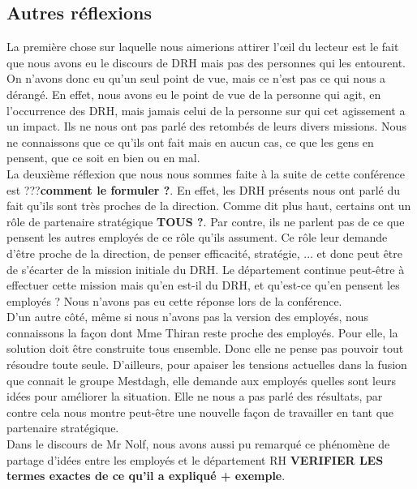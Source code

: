 \subsection{Autres réflexions}

La première chose sur laquelle nous aimerions attirer l'œil du lecteur est le fait que nous avons eu le discours de DRH mais pas des personnes qui les entourent. On n'avons donc eu qu'un seul point de vue, mais ce n'est pas ce qui nous a dérangé. En effet, nous avons eu le point de vue de la personne qui agit, en l'occurrence des DRH, mais jamais celui de la personne sur qui cet agissement a un impact. Ils ne nous ont pas parlé des retombés de leurs divers missions. Nous ne connaissons que ce qu'ils ont fait mais en aucun cas, ce que les gens en pensent, que ce soit en bien ou en mal. \\ 

La deuxième réflexion que nous nous sommes faite à la suite de cette conférence est ???\textbf{comment le formuler ?}. En effet, les DRH présents nous ont parlé du fait qu'ils sont très proches de la direction. Comme dit plus haut, certains ont un rôle de partenaire stratégique \textbf{TOUS ?}. Par contre, ils ne parlent pas de ce que pensent les autres employés de ce rôle qu'ils assument. Ce rôle leur demande d'être proche de la direction, de penser efficacité, stratégie, ... et donc peut être de s'écarter de la mission initiale du DRH. Le département continue peut-être à effectuer cette mission mais qu'en est-il du DRH, et qu'est-ce qu'en pensent les employés ? Nous n'avons pas eu cette réponse lors de la conférence. \\

D'un autre côté, même si nous n'avons pas la version des employés, nous connaissons la façon dont Mme Thiran reste proche des employés. Pour elle, la solution doit être construite tous ensemble. Donc elle ne pense pas pouvoir tout résoudre toute seule. D'ailleurs, pour apaiser les tensions actuelles dans la fusion que connait le groupe Mestdagh, elle demande aux employés quelles sont leurs idées pour améliorer la situation. Elle ne nous a pas parlé des résultats, par contre cela nous montre peut-être une nouvelle façon de travailler en tant que partenaire stratégique. \\

Dans le discours de Mr Nolf, nous avons aussi pu remarqué ce phénomène de partage d'idées entre les employés et le département RH \textbf{VERIFIER LES termes exactes de ce qu'il a expliqué + exemple}. \\

